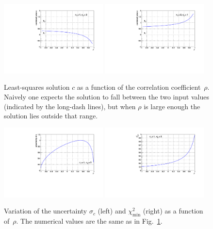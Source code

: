 \documentclass[11pt]{article}
\newcommand{\chisqmin} {\chi^2_{\mathrm{min}}}
\newcommand{\uc} {\sigma_{c}}
\begin{document}
\begin{figure}
\begin{center}
\includegraphics[width=0.48\textwidth]{c1.pdf}
\includegraphics[width=0.48\textwidth]{c2.pdf}
\caption[.]{\label{fig:c1c2}
Least-squares solution $c$ as a function of the correlation coefficient~$\rho$.
Naively one expects the solution to fall between the two input values (indicated
by the long-dash lines), but when $\rho$ is large enough the solution lies outside that range.}
\end{center}
\end{figure}



\begin{figure}
\begin{center}
\includegraphics[width=0.48\textwidth]{cu.pdf}
\includegraphics[width=0.48\textwidth]{cchisq.pdf}
\caption[.]{\label{fig:cucchisq}
Variation of the uncertainty $\uc$ (left) and $\chisqmin$ (right)
as a function of~$\rho$.  The numerical values are the same as
in Fig.~\ref{fig:c1c2}.}
\end{center}
\end{figure}
\end{document}
